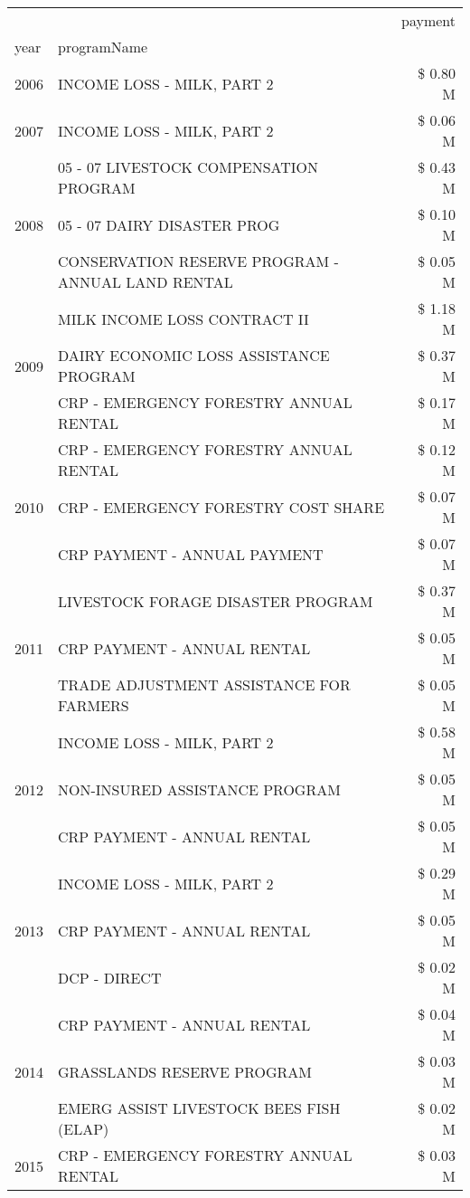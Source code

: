 \begin{tabular}{llr}
\toprule
 &  & payment \\
year & programName &  \\
\midrule
2006 & INCOME LOSS - MILK, PART 2 & \$ 0.80 M \\
\cline{1-3}
2007 & INCOME LOSS - MILK, PART 2 & \$ 0.06 M \\
\cline{1-3}
\multirow[t]{3}{*}{2008} & 05 - 07 LIVESTOCK COMPENSATION PROGRAM & \$ 0.43 M \\
 & 05 - 07 DAIRY DISASTER PROG & \$ 0.10 M \\
 & CONSERVATION RESERVE PROGRAM - ANNUAL LAND RENTAL & \$ 0.05 M \\
\cline{1-3}
\multirow[t]{3}{*}{2009} & MILK INCOME LOSS CONTRACT II & \$ 1.18 M \\
 & DAIRY ECONOMIC LOSS ASSISTANCE PROGRAM & \$ 0.37 M \\
 & CRP - EMERGENCY FORESTRY ANNUAL RENTAL & \$ 0.17 M \\
\cline{1-3}
\multirow[t]{3}{*}{2010} & CRP - EMERGENCY FORESTRY ANNUAL RENTAL & \$ 0.12 M \\
 & CRP - EMERGENCY FORESTRY COST SHARE & \$ 0.07 M \\
 & CRP PAYMENT - ANNUAL PAYMENT & \$ 0.07 M \\
\cline{1-3}
\multirow[t]{3}{*}{2011} & LIVESTOCK FORAGE DISASTER PROGRAM & \$ 0.37 M \\
 & CRP PAYMENT - ANNUAL RENTAL & \$ 0.05 M \\
 & TRADE ADJUSTMENT ASSISTANCE FOR FARMERS & \$ 0.05 M \\
\cline{1-3}
\multirow[t]{3}{*}{2012} & INCOME LOSS - MILK, PART 2 & \$ 0.58 M \\
 & NON-INSURED ASSISTANCE PROGRAM & \$ 0.05 M \\
 & CRP PAYMENT - ANNUAL RENTAL & \$ 0.05 M \\
\cline{1-3}
\multirow[t]{3}{*}{2013} & INCOME LOSS - MILK, PART 2 & \$ 0.29 M \\
 & CRP PAYMENT - ANNUAL RENTAL & \$ 0.05 M \\
 & DCP - DIRECT & \$ 0.02 M \\
\cline{1-3}
\multirow[t]{3}{*}{2014} & CRP PAYMENT - ANNUAL RENTAL & \$ 0.04 M \\
 & GRASSLANDS RESERVE PROGRAM & \$ 0.03 M \\
 & EMERG ASSIST LIVESTOCK BEES FISH (ELAP) & \$ 0.02 M \\
\cline{1-3}
\multirow[t]{3}{*}{2015} & CRP - EMERGENCY FORESTRY ANNUAL RENTAL & \$ 0.03 M \\

\end{tabular}

